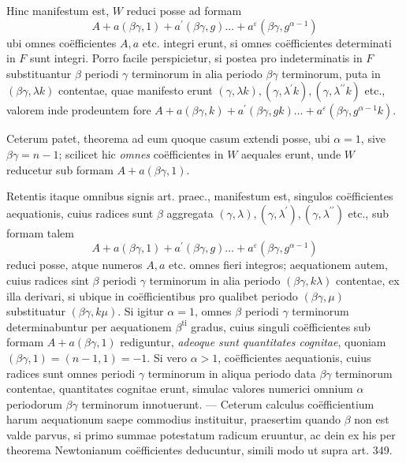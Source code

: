 Hinc manifestum est, \(W\) reduci posse ad formam \[A+a(\beta\gamma,1)+a^{\prime}(\beta\gamma,g)\ldots+a^\varepsilon(\beta\gamma,g^{\alpha-1})\] ubi omnes coëfficientes \(A,\allowbreak a\) etc. integri erunt, si omnes coëfficientes determinati in \(F\) sunt integri. Porro facile perspicietur, si postea pro indeterminatis in \(F\) substituantur \(\beta\) periodi \(\gamma\) terminorum in alia periodo \(\beta\gamma\) terminorum, puta in \((\beta\gamma,\lambda k)\) contentae, quae manifesto erunt \((\gamma,\lambda k),\allowbreak (\gamma,\lambda^{\prime}k),\allowbreak (\gamma,\lambda^{\prime\prime}k)\) etc., valorem inde prodeuntem fore \(A+a(\beta\gamma,k)+a^{\prime}(\beta\gamma,gk)\ldots+a^\varepsilon(\beta\gamma,g^{\alpha-1}k)\).

Ceterum patet, theorema ad eum quoque casum extendi posse, ubi \(\alpha=1\), sive \(\beta\gamma=n-1\); scilicet hic \textit{omnes} coëfficientes in \(W\) aequales erunt, unde \(W\) reducetur sub formam \(A+a(\beta\gamma,1)\).

Retentis itaque omnibus signis art. praec., manifestum est, singulos coëfficientes aequationis, cuius radices sunt \(\beta\) aggregata \((\gamma,\lambda),\allowbreak (\gamma,\lambda^{\prime}),\allowbreak (\gamma,\lambda^{\prime\prime})\) etc., sub formam talem \[A+a(\beta\gamma,1)+a^{\prime}(\beta\gamma,g)\ldots+a^\varepsilon(\beta\gamma,g^{\alpha-1})\] reduci posse, atque numeros \(A,\allowbreak a\) etc. omnes fieri integros; aequationem autem, cuius radices sint \(\beta\) periodi \(\gamma\) terminorum in alia periodo \((\beta\gamma,k\lambda)\) contentae, ex illa derivari, si ubique in coëfficientibus pro qualibet periodo \((\beta\gamma,\mu)\) substituatur \((\beta\gamma,k\mu)\). Si igitur \(\alpha=1\), omnes \(\beta\) periodi \(\gamma\) terminorum determinabuntur per aequationem \(\beta^{\mathrm{ti}}\) gradus, cuius singuli coëfficientes sub formam \(A+a(\beta\gamma,1)\) rediguntur, \textit{adeoque sunt quantitates cognitae}, quoniam \((\beta\gamma,1)=(n-1,1)=-1\). Si vero \(\alpha>1\), coëfficientes aequationis, cuius radices sunt omnes periodi \(\gamma\) terminorum in aliqua periodo data \(\beta\gamma\) terminorum contentae, quantitates cognitae erunt, simulac valores numerici omnium \(\alpha\) periodorum \(\beta\gamma\) terminorum innotuerunt. — Ceterum calculus coëfficientium harum aequationum saepe commodius instituitur, praesertim quando \(\beta\) non est valde parvus, si primo summae potestatum radicum eruuntur, ac dein ex his per theorema Newtonianum coëfficientes deducuntur, simili modo ut supra art. 349.

